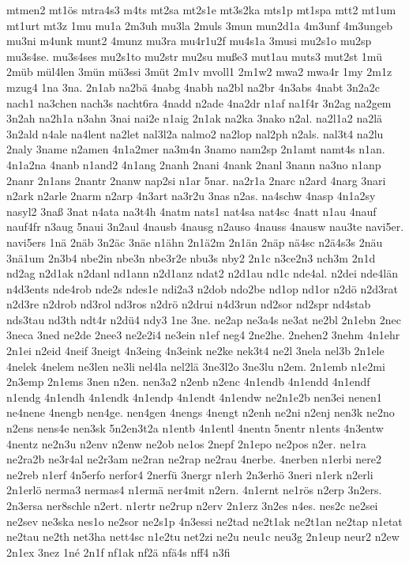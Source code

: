 {mtmen2
mt1ös
mtra4s3
m4ts
mt2sa
mt2s1e
mt3s2ka
mts1p
mt1spa
mtt2
mt1um
mt1urt
mt3z
1mu
mu1a
2m3uh
mu3la
2muls
3mun
mun2d1a
4m3unf
4m3ungeb
mu3ni
m4unk
munt2
4munz
mu3ra
mu4r1u2f
mu4s1a
3musi
mu2s1o
mu2sp
mu3s4se.
mu3s4ses
mu2s1to
mu2str
mu2su
muße3
mut1au
muts3
mut2st
1mü
2müb
mül4len
3mün
mü3ssi
3müt
2m1v
mvoll1
2m1w2
mwa2
mwa4r
1my
2m1z
mzug4
1na
3na.
2n1ab
na2bä
4nabg
4nabh
na2bl
na2br
4n3abs
4nabt
3n2a2c
nach1
na3chen
nach3s
nacht6ra
4nadd
n2ade
4na2dr
n1af
na1f4r
3n2ag
na2gem
3n2ah
na2h1a
n3ahn
3nai
nai2e
n1aig
2n1ak
na2ka
3nako
n2al.
na2l1a2
na2lä
3n2ald
n4ale
na4lent
na2let
nal3l2a
nalmo2
na2lop
nal2ph
n2als.
nal3t4
na2lu
2naly
3name
n2amen
4n1a2mer
na3m4n
3namo
nam2sp
2n1amt
namt4s
n1an.
4n1a2na
4nanb
n1and2
4n1ang
2nanh
2nani
4nank
2nanl
3nann
na3no
n1anp
2nanr
2n1ans
2nantr
2nanw
nap2si
n1ar
5nar.
na2r1a
2narc
n2ard
4narg
3nari
n2ark
n2arle
2narm
n2arp
4n3art
na3r2u
3nas
n2as.
na4schw
4nasp
4n1a2sy
nasyl2
3naß
3nat
n4ata
na3t4h
4natm
nats1
nat4sa
nat4sc
4natt
n1au
4nauf
nauf4fr
n3aug
5naui
3n2aul
4nausb
4nausg
n2auso
4nauss
4nausw
nau3te
navi5er.
navi5ers
1nä
2näb
3n2äc
3näe
n1ähn
2n1ä2m
2n1än
2näp
nä4sc
n2ä4s3s
2näu
3nä1um
2n3b4
nbe2in
nbe3n
nbe3r2e
nbu3s
nby2
2n1c
n3ce2n3
nch3m
2n1d
nd2ag
n2d1ak
n2danl
nd1ann
n2d1anz
ndat2
n2d1au
nd1c
nde4al.
n2dei
nde4län
n4d3ents
nde4rob
nde2s
ndes1e
ndi2a3
n2dob
ndo2be
nd1op
nd1or
n2dö
n2d3rat
n2d3re
n2drob
nd3rol
nd3ros
n2drö
n2drui
n4d3run
nd2sor
nd2spr
nd4stab
nds3tau
nd3th
ndt4r
n2dü4
ndy3
1ne
3ne.
ne2ap
ne3a4s
ne3at
ne2bl
2n1ebn
2nec
3neca
3ned
ne2de
2nee3
ne2e2i4
ne3ein
n1ef
neg4
2ne2he.
2nehen2
3nehm
4n1ehr
2n1ei
n2eid
4neif
3neigt
4n3eing
4n3eink
ne2ke
nek3t4
ne2l
3nela
nel3b
2n1ele
4nelek
4nelem
ne3len
ne3li
nel4la
nel2lä
3ne3l2o
3ne3lu
n2em.
2n1emb
n1e2mi
2n3emp
2n1ems
3nen
n2en.
nen3a2
n2enb
n2enc
4n1endb
4n1endd
4n1endf
n1endg
4n1endh
4n1endk
4n1endp
4n1endt
4n1endw
ne2n1e2b
nen3ei
nenen1
ne4nene
4nengb
nen4ge.
nen4gen
4nengs
4nengt
n2enh
ne2ni
n2enj
nen3k
ne2no
n2ens
nens4e
nen3sk
5n2en3t2a
n1entb
4n1entl
4nentn
5nentr
n1ents
4n3entw
4nentz
ne2n3u
n2env
n2enw
ne2ob
ne1os
2nepf
2n1epo
ne2pos
n2er.
ne1ra
ne2ra2b
ne3r4al
ne2r3am
ne2ran
ne2rap
ne2rau
4nerbe.
4nerben
n1erbi
nere2
ne2reb
n1erf
4n5erfo
nerfor4
2nerfü
3nergr
n1erh
2n3erhö
3neri
n1erk
n2erli
2n1erlö
nerma3
nermas4
n1ermä
ner4mit
n2ern.
4n1ernt
ne1rös
n2erp
3n2ers.
2n3ersa
ner8schle
n2ert.
n1ertr
ne2rup
n2erv
2n1erz
3n2es
n4es.
nes2c
ne2sei
ne2sev
ne3ska
nes1o
ne2sor
ne2s1p
4n3essi
ne2tad
ne2t1ak
ne2t1an
ne2tap
n1etat
ne2tau
ne2th
net3ha
nett4sc
n1e2tu
net2zi
ne2u
neu1c
neu3g
2n1eup
neur2
n2ew
2n1ex
3nez
1né
2n1f
nf1ak
nf2ä
nfä4s
nff4
n3fi
}
